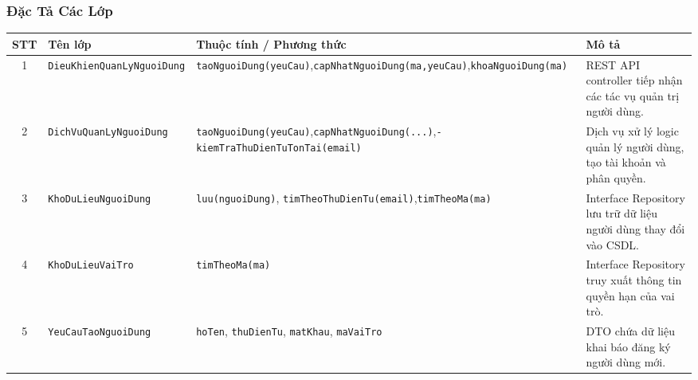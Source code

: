 \subsubsection{Đặc Tả Các Lớp}
\begin{table}[H]
  \centering
  \small
  \begin{tabularx}{\textwidth}{|c|>{\raggedright\arraybackslash}p{3.5cm}|>{\raggedright\arraybackslash}p{4.5cm}|>{\raggedright\arraybackslash}X|}
    \hline
    \textbf{STT} & \textbf{Tên lớp} & \textbf{Thuộc tính / Phương thức} & \textbf{Mô tả} \\
    \hline
    1 & \texttt{Dieu\allowbreak Khien\allowbreak Quan\allowbreak Ly\allowbreak Nguoi\allowbreak Dung} & \texttt{tao\allowbreak Nguoi\allowbreak Dung\allowbreak (yeu\allowbreak Cau)},\newline \texttt{cap\allowbreak Nhat\allowbreak Nguoi\allowbreak Dung\allowbreak (ma,\allowbreak yeu\allowbreak Cau)},\newline \texttt{khoa\allowbreak Nguoi\allowbreak Dung\allowbreak (ma)} & REST API controller tiếp nhận các tác vụ quản trị người dùng. \\ \hline
    2 & \texttt{Dich\allowbreak Vu\allowbreak Quan\allowbreak Ly\allowbreak Nguoi\allowbreak Dung} & \texttt{tao\allowbreak Nguoi\allowbreak Dung\allowbreak (yeu\allowbreak Cau)},\newline \texttt{cap\allowbreak Nhat\allowbreak Nguoi\allowbreak Dung\allowbreak (...)},\newline \texttt{- kiem\allowbreak Tra\allowbreak Thu\allowbreak Dien\allowbreak Tu\allowbreak Ton\allowbreak Tai\allowbreak (email)} & Dịch vụ xử lý logic quản lý người dùng, tạo tài khoản và phân quyền. \\ \hline
    3 & \texttt{Kho\allowbreak Du\allowbreak Lieu\allowbreak Nguoi\allowbreak Dung} & \texttt{luu\allowbreak (nguoi\allowbreak Dung)}, \texttt{tim\allowbreak Theo\allowbreak Thu\allowbreak Dien\allowbreak Tu\allowbreak (email)},\newline \texttt{tim\allowbreak Theo\allowbreak Ma\allowbreak (ma)} & Interface Repository lưu trữ dữ liệu người dùng thay đổi vào CSDL. \\ \hline
    4 & \texttt{Kho\allowbreak Du\allowbreak Lieu\allowbreak Vai\allowbreak Tro} & \texttt{tim\allowbreak Theo\allowbreak Ma\allowbreak (ma)} & Interface Repository truy xuất thông tin quyền hạn của vai trò. \\ \hline
    5 & \texttt{Yeu\allowbreak Cau\allowbreak Tao\allowbreak Nguoi\allowbreak Dung} & \texttt{ho\allowbreak Ten}, \texttt{thu\allowbreak Dien\allowbreak Tu}, \texttt{mat\allowbreak Khau}, \texttt{ma\allowbreak Vai\allowbreak Tro} & DTO chứa dữ liệu khai báo đăng ký người dùng mới. \\ \hline

\end{tabularx}
\end{table}
